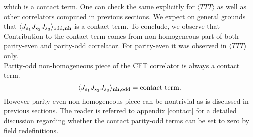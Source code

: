 \documentclass[a4paper,11pt]{article}
\begin{document}
which is a contact term. One can check the same explicitly for  $\langle TTT \rangle$ as well as other correlators computed in previous sections. 
We expect on general grounds that $\langle J_{s_1}J_{s_2}J_{s_3}\rangle_{\text{odd},\bf{nh}}$ is a contact term. To conclude, we observe that \\ 

 Contribution to the contact term comes from non-homogeneous part of both parity-even and parity-odd correlator. For parity-even it was observed  in $\langle TTT\rangle$ only. \\

 Parity-odd non-homogeneous piece of the CFT correlator is always a contact term.
\begin{equation}
    \langle J_{s_1} J_{s_2} J_{s_3} \rangle_{\bf{nh},\text{odd}} = \rm{contact~ term.}
\end{equation}
However parity-even non-homogeneous piece can be nontrivial as is discussed in previous sections. The reader is referred to appendix \ref{contact} for a detailed discussion regarding whether the contact parity-odd terms can be set to zero by field redefinitions.
\end{document}

